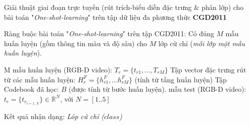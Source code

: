 	\begin{algorithm}
	\caption{Giải thuật giai đoạn trực tuyến (rút trích-biểu diễn đặc trưng \& phân lớp) cho bài toán "\textit{One-shot-learning}" trên tập dữ liệu đa phương thức \textbf{CGD2011}\cite{chalearn_dataset}}
	\label{alg_cgd2011}
	Ràng buộc bài toán "\textit{One-shot-learning}" trên tập CGD2011: Có đúng $M$ mẫu huấn luyện (gồm thông tin màu và độ sâu) cho $M$ lớp cử chỉ (\textit{mỗi lớp một mẫu huấn luyện}).
	{\fontsize{12}{12}\selectfont
	\begin{algorithmic}
	\renewcommand{\algorithmicrequire}{\textbf{Đầu vào:}}
	\renewcommand{\algorithmicensure}{\textbf{Đầu ra:}}
	\algnewcommand{}
	\algnewcommand\Operation{\item[\algorithmicoperation]}
	
	\Require 
	\State M mẫu huấn luyện (RGB-D video): \(T_r = \{t_{r1},...,T_{rM}\}\)	
	\State Tập vector đặc trưng rút từ các mẫu huấn luyện: \(H_{r}^F = \{h_{r1}^F,...h_{rM}^F\}\) (tính từ tầng huấn luyện)
	\State Tập Codebook đã học: \(B\) (được tính từ bước huấn luyện).
	 mẫu test (RGB-D video): \(t_e = \{t_{e_{i=1..N}}\} \in \mathbb{R}^N\), với $N=[1..5]$
	
	\Ensure 
	\State Kết quả nhận dạng: \textit{Lóp cử chỉ ($class$)}
	

\end{algorithmic}}
\end{algorithm}

